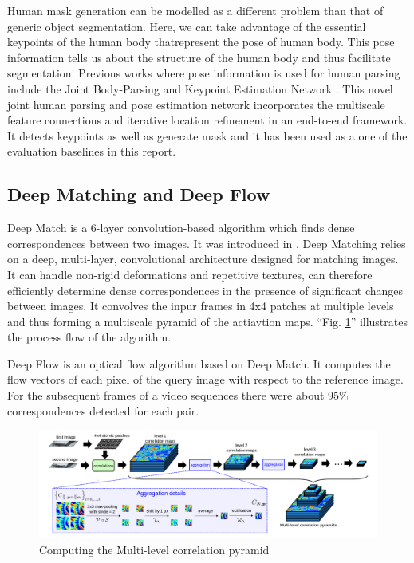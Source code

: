 \documentclass[conference]{IEEEtran}
\begin{document}
Human mask generation can be modelled as a different problem than that of generic object segmentation. Here, we can take advantage of the essential keypoints of the human body thatrepresent the pose of human body. This pose information tells us about the structure of the human body and thus facilitate segmentation. Previous works where pose information is used for human parsing include the Joint Body-Parsing and Keypoint Estimation Network \cite{jppNet}. This novel joint human parsing and pose estimation network incorporates the multiscale feature connections and iterative location refinement in an end-to-end framework. It detects keypoints as well as generate mask and it has been used as a one of the evaluation baselines in this report. 
 
\subsection{Deep Matching and Deep Flow} \label{DM}

Deep Match is a 6-layer convolution-based algorithm which finds dense correspondences between two images. It was introduced in \cite{deepmatch}. Deep Matching relies on a deep, multi-layer, convolutional architecture designed for matching images. It can handle non-rigid deformations and repetitive textures, can therefore efficiently determine dense correspondences in the presence of significant changes between images. It convolves the inpur frames in 4x4 patches at multiple levels and thus forming a multiscale pyramid of the actiavtion maps. ``Fig. \ref{fig:dm_net}'' illustrates the process flow of the algorithm.

Deep Flow is an optical flow algorithm based on Deep Match. It computes the flow vectors of each pixel of the query image with respect to the reference image. For the subsequent frames of a video sequences there were about 95\% correspondences detected for each pair.
\begin{figure}[htbp]
\centerline{\includegraphics[width=\linewidth]{dm_net}}
\caption{Computing the Multi-level correlation pyramid}
\label{fig:dm_net}
\end{figure}
\end{document}
